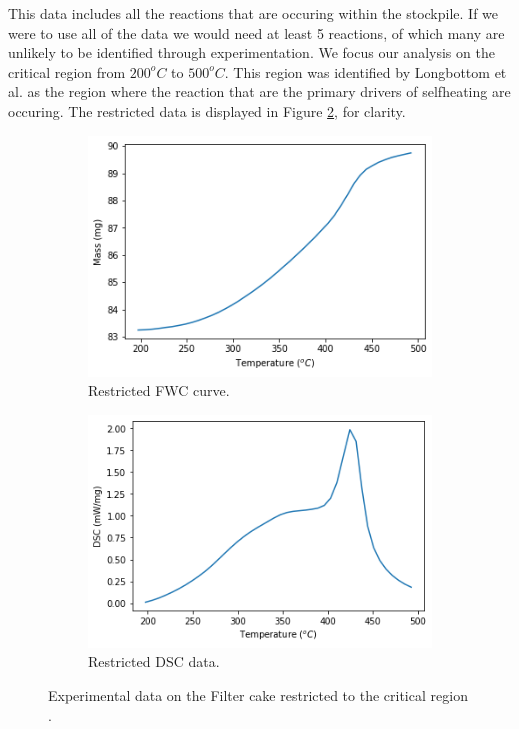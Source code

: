 This data includes all the reactions that are occuring within the stockpile. If we were to use all of the data we would need at least 5 reactions, of which many are unlikely to be identified through experimentation. We focus our analysis on the critical region from $200^oC$ to $500^oC$. This region was identified by Longbottom et al. \cite{Ray19} as the region where the reaction that are the primary drivers of selfheating are occuring. The restricted data is displayed in Figure \ref{fig:Res_data}, for clarity.\\

\begin{figure}[h!]
\centering
\begin{subfigure}{.5\textwidth}
  \centering
  \includegraphics[width=\linewidth]{figures/FWC.png}  
  \caption{Restricted FWC curve.}
\end{subfigure}%
\begin{subfigure}{.5\textwidth}
  \centering
  \includegraphics[width=\linewidth]{figures/Dsc.png}
  \caption{Restricted DSC data.}
  \label{fig:res_DSC}
\end{subfigure}
\label{fig:Res_data}
\caption{Experimental data on the Filter cake restricted to the critical region \cite{Ray19}.}
\end{figure}

